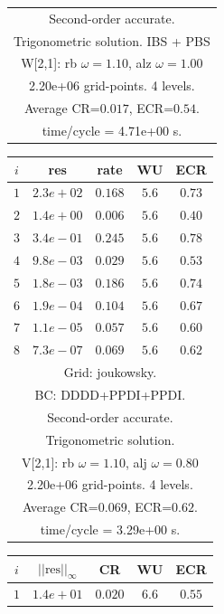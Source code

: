 \begin{table}[hbt]
\begin{center}
{\begin{tabular}{|c|c|c|c|c|}
\multicolumn{5}{|c|}{Second-order accurate.}  \\
\multicolumn{5}{|c|}{Trigonometric solution. IBS + PBS}  \\
\multicolumn{5}{|c|}{W[2,1]: rb $\omega=1.10$, alz $\omega=1.00$}  \\
\multicolumn{5}{|c|}{2.20e+06 grid-points. 4 levels.}  \\
\multicolumn{5}{|c|}{Average CR=$0.017$, ECR=$0.54$.}  \\
\multicolumn{5}{|c|}{time/cycle = 4.71e+00 s.}  \\
\hline 
\end{tabular}
\begin{tabular}{|c|c|c|c|c|} \hline 
 $i$   & res      & rate    &  WU    & ECR  \\   \hline 
 $ 1$  & $ 2.3e+02$ & $0.168$ & $ 5.6$ & $0.73$ \\ 
 $ 2$  & $ 1.4e+00$ & $0.006$ & $ 5.6$ & $0.40$ \\ 
 $ 3$  & $ 3.4e-01$ & $0.245$ & $ 5.6$ & $0.78$ \\ 
 $ 4$  & $ 9.8e-03$ & $0.029$ & $ 5.6$ & $0.53$ \\ 
 $ 5$  & $ 1.8e-03$ & $0.186$ & $ 5.6$ & $0.74$ \\ 
 $ 6$  & $ 1.9e-04$ & $0.104$ & $ 5.6$ & $0.67$ \\ 
 $ 7$  & $ 1.1e-05$ & $0.057$ & $ 5.6$ & $0.60$ \\ 
 $ 8$  & $ 7.3e-07$ & $0.069$ & $ 5.6$ & $0.62$ \\ 
\hline 
\multicolumn{5}{|c|}{Grid: joukowsky.}  \\
\multicolumn{5}{|c|}{BC: DDDD+PPDI+PPDI.}  \\
\multicolumn{5}{|c|}{Second-order accurate.}  \\
\multicolumn{5}{|c|}{Trigonometric solution.}  \\
\multicolumn{5}{|c|}{V[2,1]: rb $\omega=1.10$, alj $\omega=0.80$}  \\
\multicolumn{5}{|c|}{2.20e+06 grid-points. 4 levels.}  \\
\multicolumn{5}{|c|}{Average CR=$0.069$, ECR=$0.62$.}  \\
\multicolumn{5}{|c|}{time/cycle = 3.29e+00 s.}  \\
\hline 
\end{tabular}
\qquad
\begin{tabular}{|c|c|c|c|c|} \hline 
 $i$   & $\vert\vert\mbox{res}\vert\vert_\infty$  &  CR     &  WU    & ECR  \\   \hline 
 $ 1$  & $ 1.4e+01$ & $0.020$ & $ 6.6$ & $0.55$ \\ 

\end{tabular}}
\end{center}
\end{table}
